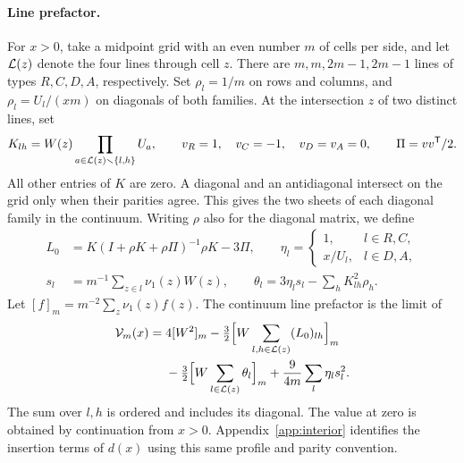 \paragraph{Line prefactor.}
For \(x>0\), take a midpoint grid with an even number \(m\) of cells per side, and let
\(\mathcal L(z)\) denote the four lines through cell \(z\). There are \(m,m,2m-1,2m-1\) lines of
types \(R,C,D,A\), respectively. Set \(\rho_l=1/m\) on rows and columns, and \(\rho_l=U_l/(xm)\)
on diagonals of both families. At the intersection \(z\) of two distinct lines, set
\[
 K_{lh}=W(z)\prod_{a\in \mathcal L(z)\smallsetminus\{l,h\}}U_a,\qquad
 v_R=1,\quad v_C=-1,\quad v_D=v_A=0,\qquad \Pi=vv^{\mathsf T}/2.
\]
All other entries of \(K\) are zero. A diagonal and an antidiagonal intersect on the grid only
when their parities agree. This gives the two sheets of each diagonal family in the continuum.
Writing \(\rho\) also for the diagonal matrix, we define
\begin{align*}
 L_0&=K(I+\rho K+\rho\Pi)^{-1}\rho K-3\Pi,\qquad
 \eta_l=\begin{cases}1,&l\in R,C,\\ x/U_l,&l\in D,A,\end{cases}\\
 s_l&=m^{-1}\sum_{z\in l}\nu_1(z)W(z),\qquad
 \theta_l=3\eta_l s_l-\sum_h K_{lh}^2\rho_h .
\end{align*}
Let \([f]_m=m^{-2}\sum_z\nu_1(z)f(z)\). The continuum line prefactor is the limit of
\begin{align}
 \mathcal V_m(x)={}&4[W^2]_m
 -\tfrac32\Big[W\sum_{l,h\in \mathcal L(z)}(L_0)_{lh}\Big]_m\notag\\
 &-\tfrac32\Big[W\sum_{l\in \mathcal L(z)}\theta_l\Big]_m
 +\frac{9}{4m}\sum_l\eta_l s_l^2 .\label{eq:V-def}
\end{align}
The sum over \(l,h\) is ordered and includes its diagonal. The value at zero is obtained by
continuation from \(x>0\). Appendix~\ref{app:interior} identifies the insertion terms of \(d(x)\)
using this same profile and parity convention.
